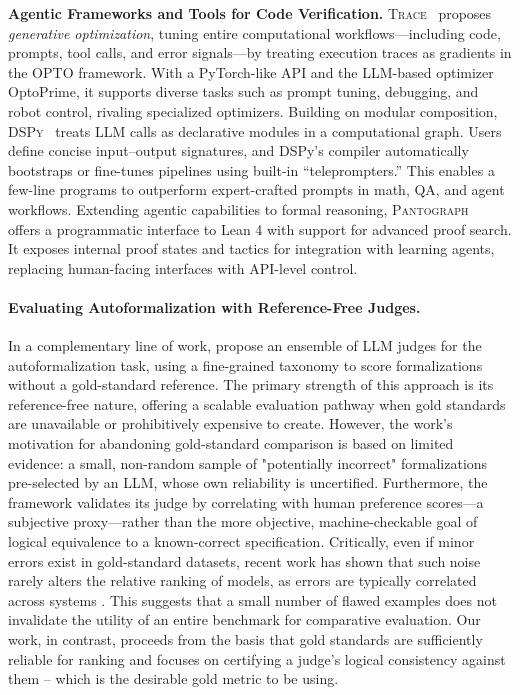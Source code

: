 \textbf{Agentic Frameworks and Tools for Code Verification.}
\textsc{Trace}~\citep{cheng2024trace} proposes \emph{generative optimization}, tuning entire computational workflows—including code, prompts, tool calls, and error signals—by treating execution traces as gradients in the OPTO framework. With a PyTorch-like API and the LLM-based optimizer OptoPrime, it supports diverse tasks such as prompt tuning, debugging, and robot control, rivaling specialized optimizers.
Building on modular composition, \textsc{DSPy}~\citep{khattab2024dspy} treats LLM calls as declarative modules in a computational graph. Users define concise input–output signatures, and DSPy’s compiler automatically bootstraps or fine-tunes pipelines using built-in “teleprompters.” This enables a few-line programs to outperform expert-crafted prompts in math, QA, and agent workflows.
Extending agentic capabilities to formal reasoning, \textsc{Pantograph}~\citep{aniva2025pantograph} offers a programmatic interface to Lean 4 with support for advanced proof search. It exposes internal proof states and tactics for integration with learning agents, replacing human-facing interfaces with API-level control.

\paragraph{Evaluating Autoformalization with Reference-Free Judges.}
In a complementary line of work, \citet{zhang2025goldstandardsepistemicensemble} propose an ensemble of LLM judges for the autoformalization task, using a fine-grained taxonomy to score formalizations without a gold-standard reference. 
The primary strength of this approach is its reference-free nature, offering a scalable evaluation pathway when gold standards are unavailable or prohibitively expensive to create. 
However, the work's motivation for abandoning gold-standard comparison is based on limited evidence: a small, non-random sample of "potentially incorrect" formalizations pre-selected by an LLM, whose own reliability is uncertified. 
Furthermore, the framework validates its judge by correlating with human preference scores—a subjective proxy—rather than the more objective, machine-checkable goal of logical equivalence to a known-correct specification. 
Critically, even if minor errors exist in gold-standard datasets, recent work has shown that such noise rarely alters the relative ranking of models, as errors are typically correlated across systems \citep{salaudeen2024imagenotcontrastimagenetpreserves}. 
This suggests that a small number of flawed examples does not invalidate the utility of an entire benchmark for comparative evaluation. 
Our work, in contrast, proceeds from the basis that gold standards are sufficiently reliable for ranking and focuses on certifying a judge's logical consistency against them -- which is the desirable gold metric to be using.

